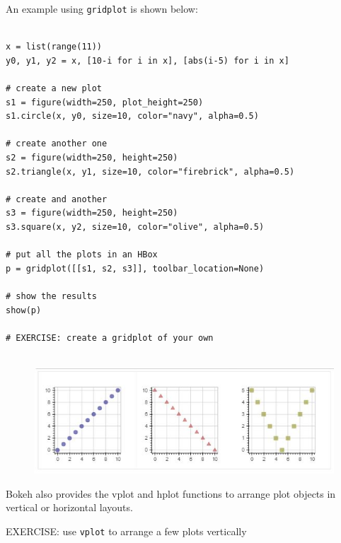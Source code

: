 \documentclass[a4paper,12pt]{article}
\begin{document}
An example using \texttt{gridplot} is shown below:
\begin{framed}
	\begin{verbatim}

x = list(range(11))
y0, y1, y2 = x, [10-i for i in x], [abs(i-5) for i in x]

# create a new plot
s1 = figure(width=250, plot_height=250)
s1.circle(x, y0, size=10, color="navy", alpha=0.5)

# create another one
s2 = figure(width=250, height=250)
s2.triangle(x, y1, size=10, color="firebrick", alpha=0.5)

# create and another
s3 = figure(width=250, height=250)
s3.square(x, y2, size=10, color="olive", alpha=0.5)

# put all the plots in an HBox
p = gridplot([[s1, s2, s3]], toolbar_location=None)

# show the results
show(p)

# EXERCISE: create a gridplot of your own
	
\end{verbatim}
\end{framed}
\newpage
\begin{figure}[h!]
\centering
\includegraphics[width=1.1\linewidth]{images/06-interactions-tut-01}

\end{figure}



Bokeh also provides the vplot and hplot functions to arrange plot objects in vertical or horizontal layouts.

\bigskip
\noindent EXERCISE: use \texttt{vplot} to arrange a few plots vertically
\end{document}
